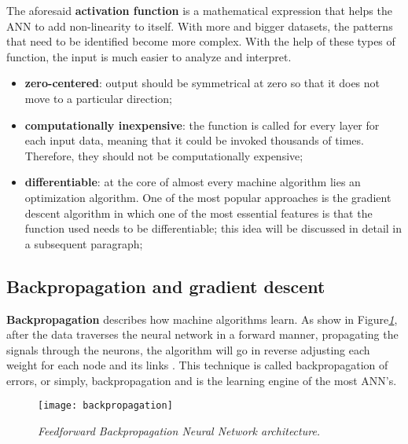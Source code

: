 The aforesaid \textbf{activation function} is a mathematical expression that helps
the ANN to add non-linearity to itself. With more and bigger datasets,
the patterns that need to be identified become more complex.
With the help of these types of function, the input is much easier to analyze and interpret.

\begin{itemize}
    \item{
          \textbf{zero-centered}: output should be symmetrical
          at zero so that it does not move to a particular direction;
          }
    \item{
          \textbf{computationally inexpensive}: the function is called for every layer
          for each input data, meaning that it could be invoked thousands of times.
          Therefore, they should not be computationally expensive;
          }
    \item{
          \textbf{differentiable}: at the core of almost every machine algorithm lies
          an optimization algorithm. One of the most popular
          approaches is the gradient descent algorithm in which one of the most essential
          features is that the function used needs to be differentiable;
          this idea will be discussed in detail in a subsequent paragraph;
          }
\end{itemize}



\subsection{Backpropagation and gradient descent}

\textbf{Backpropagation} describes how machine algorithms learn.
As show in Figure\emph{\ref{fig:backpropagation}},
after the data traverses the neural network in a forward manner,
propagating the signals through the neurons,
the algorithm will go in reverse adjusting each weight for each node and its links \cite{Goodfellow-et-al-2016}.
This technique is called backpropagation of errors, or simply,
backpropagation and is the learning engine of the most ANN's.

\begin{figure}[h]
    \centering
    \texttt{[image: backpropagation]}
    \caption{\emph{Feedforward Backpropagation Neural Network architecture. \cite{backpropagation}}}
    \label{fig:backpropagation}
\end{figure}


